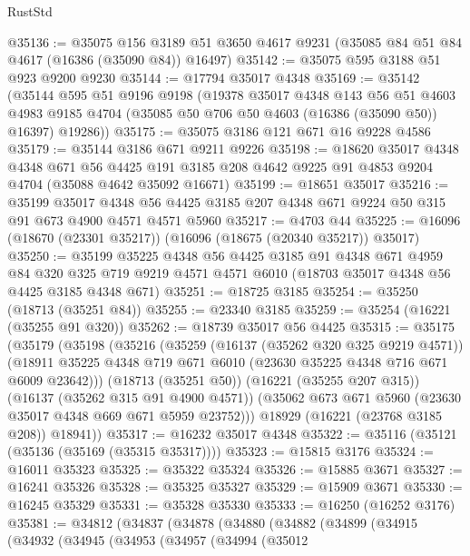 \begin{lexlean}{RustStd}
\begin{coremodule}
@35136 := @35075
    @156
    @3189
    @51
    @3650
    @4617
    @9231
    (@35085 @84 @51 @84 @4617 (@16386 (@35090 @84)) @16497)
@35142 := @35075 @595 @3188 @51 @923 @9200 @9230
@35144 := @17794 @35017 @4348
@35169 := @35142
    (@35144
      @595
      @51
      @9196
      @9198
      (@19378
        @35017
        @4348
        @143
        @56
        @51
        @4603
        @4983
        @9185
        @4704
        (@35085 @50 @706 @50 @4603 (@16386 (@35090 @50)) @16397)
        @19286))
@35175 := @35075 @3186 @121 @671 @16 @9228 @4586
@35179 := @35144 @3186 @671 @9211 @9226
@35198 := @18620
    @35017
    @4348
    @4348
    @671
    @56
    @4425
    @191
    @3185
    @208
    @4642
    @9225
    @91
    @4853
    @9204
    @4704
    (@35088 @4642 @35092 @16671)
@35199 := @18651 @35017
@35216 := @35199
    @35017
    @4348
    @56
    @4425
    @3185
    @207
    @4348
    @671
    @9224
    @50
    @315
    @91
    @673
    @4900
    @4571
    @4571
    @5960
@35217 := @4703 @44
@35225 := @16096 (@18670 (@23301 @35217)) (@16096 (@18675 (@20340 @35217)) @35017)
@35250 := @35199
    @35225
    @4348
    @56
    @4425
    @3185
    @91
    @4348
    @671
    @4959
    @84
    @320
    @325
    @719
    @9219
    @4571
    @4571
    @6010
    (@18703 @35017 @4348 @56 @4425 @3185 @4348 @671)
@35251 := @18725 @3185
@35254 := @35250 (@18713 (@35251 @84))
@35255 := @23340 @3185
@35259 := @35254 (@16221 (@35255 @91 @320))
@35262 := @18739 @35017 @56 @4425
@35315 := @35175
    (@35179
      (@35198
        (@35216
          (@35259
            (@16137 (@35262 @320 @325 @9219 @4571))
            (@18911 @35225 @4348 @719 @671 @6010 (@23630 @35225 @4348 @716 @671 @6009 @23642)))
          (@18713 (@35251 @50))
          (@16221 (@35255 @207 @315))
          (@16137 (@35262 @315 @91 @4900 @4571))
          (@35062 @673 @671 @5960 (@23630 @35017 @4348 @669 @671 @5959 @23752)))
        @18929
        (@16221 (@23768 @3185 @208))
        @18941))
@35317 := @16232 @35017 @4348
@35322 := @35116 (@35121 (@35136 (@35169 (@35315 @35317))))
@35323 := @15815 @3176
@35324 := @16011 @35323
@35325 := @35322 @35324
@35326 := @15885 @3671
@35327 := @16241 @35326
@35328 := @35325 @35327
@35329 := @15909 @3671
@35330 := @16245 @35329
@35331 := @35328 @35330
@35333 := @16250 (@16252 @3176)
@35381 := @34812
    (@34837
      (@34878
        (@34880
          (@34882
            (@34899
              (@34915
                (@34932
                  (@34945
                    (@34953
                      (@34957
                        (@34994
                          (@35012

\end{coremodule}
\end{lexlean}
